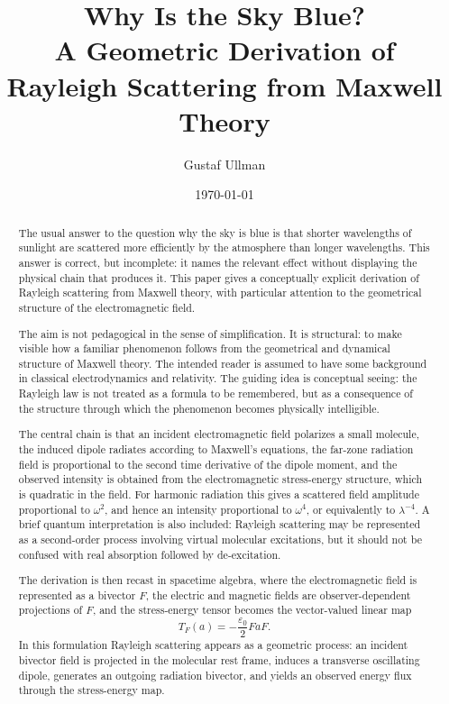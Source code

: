 \documentclass[11pt,a4paper]{article}
\title{Why Is the Sky Blue?\\
A Geometric Derivation of Rayleigh Scattering from Maxwell Theory}
\author{Gustaf Ullman}
\date{\today}
\begin{document}
\maketitle

\begin{abstract}
The usual answer to the question why the sky is blue is that shorter
wavelengths of sunlight are scattered more efficiently by the atmosphere
than longer wavelengths. This answer is correct, but incomplete: it names
the relevant effect without displaying the physical chain that produces it.
This paper gives a conceptually explicit derivation of Rayleigh scattering
from Maxwell theory, with particular attention to the geometrical structure
of the electromagnetic field.

The aim is not pedagogical in the sense of simplification. It is structural:
to make visible how a familiar phenomenon follows from the geometrical and
dynamical structure of Maxwell theory. The intended reader is assumed to have
some background in classical electrodynamics and relativity. The guiding idea
is conceptual seeing: the Rayleigh law is not treated as a formula to be
remembered, but as a consequence of the structure through which the phenomenon
becomes physically intelligible.

The central chain is that an incident electromagnetic field polarizes a small
molecule, the induced dipole radiates according to Maxwell's equations, the
far-zone radiation field is proportional to the second time derivative of the
dipole moment, and the observed intensity is obtained from the electromagnetic
stress-energy structure, which is quadratic in the field. For harmonic
radiation this gives a scattered field amplitude proportional to \(\omega^2\),
and hence an intensity proportional to \(\omega^4\), or equivalently to
\(\lambda^{-4}\). A brief quantum interpretation is also included: Rayleigh
scattering may be represented as a second-order process involving virtual
molecular excitations, but it should not be confused with real absorption
followed by de-excitation.

The derivation is then recast in spacetime algebra, where the electromagnetic
field is represented as a bivector \(F\), the electric and magnetic fields are
observer-dependent projections of \(F\), and the stress-energy tensor becomes
the vector-valued linear map
\[
T_F(a)= -\frac{\varepsilon_0}{2}FaF.
\]
In this formulation Rayleigh scattering appears as a geometric process: an
incident bivector field is projected in the molecular rest frame, induces a
transverse oscillating dipole, generates an outgoing radiation bivector, and
yields an observed energy flux through the stress-energy map.
\end{abstract}
\end{document}
